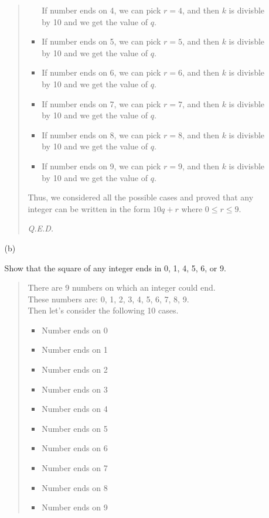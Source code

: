 \documentclass[12pt, a4paper]{article}                      %
\begin{document}
\begin{itemize}
\begin{itemize}
\begin{quote}
\begin{itemize}
If number ends on 4, we can pick $r = 4$, and then $k$ is divisble by 10 and we get the value of $q$.\\
\item
If number ends on 5, we can pick $r = 5$, and then $k$ is divisble by 10 and we get the value of $q$.\\
\item
If number ends on 6, we can pick $r = 6$, and then $k$ is divisble by 10 and we get the value of $q$.\\
\item
If number ends on 7, we can pick $r = 7$, and then $k$ is divisble by 10 and we get the value of $q$.\\
\item
If number ends on 8, we can pick $r = 8$, and then $k$ is divisble by 10 and we get the value of $q$.\\
\item
If number ends on 9, we can pick $r = 9$, and then $k$ is divisble by 10 and we get the value of $q$.\\
\end{itemize}
Thus, we considered all the possible cases and proved that any integer can be written in the form $10q + r$ where $0 \leq r \leq 9$.
\begin{flushright}
\textit{Q.E.D.}
\end{flushright}
\end{quote}
\item[(b)]
\item[]
Show that the square of any integer ends in 0, 1, 4, 5, 6, or 9.
\begin{quote}
There are 9 numbers on which an integer could end.\\
These numbers are: 0, 1, 2, 3, 4, 5, 6, 7, 8, 9.\\
Then let's consider the following 10 cases.
\begin{itemize}
\item
Number ends on 0
\item
Number ends on 1
\item
Number ends on 2
\item
Number ends on 3
\item
Number ends on 4
\item
Number ends on 5
\item
Number ends on 6
\item
Number ends on 7
\item
Number ends on 8
\item
Number ends on 9
\\

\end{itemize}
\end{quote}
\end{itemize}
\end{itemize}
\end{document}
